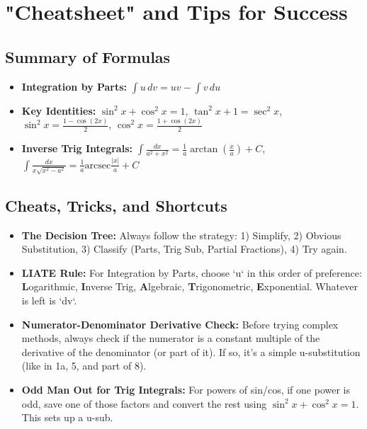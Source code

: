 \documentclass{article}
\begin{document}
\section{"Cheatsheet" and Tips for Success}
\subsection{Summary of Formulas}
\begin{itemize}
    \item \textbf{Integration by Parts:} $\int u \, dv = uv - \int v \, du$
    \item \textbf{Key Identities:} $\sin^2x+\cos^2x=1$, $\tan^2x+1=\sec^2x$, $\sin^2x = \frac{1-\cos(2x)}{2}$, $\cos^2x = \frac{1+\cos(2x)}{2}$
    \item \textbf{Inverse Trig Integrals:} $\int \frac{dx}{a^2+x^2} = \frac{1}{a}\arctan(\frac{x}{a})+C$, $\int \frac{dx}{x\sqrt{x^2-a^2}} = \frac{1}{a}\text{arcsec}\frac{|x|}{a}+C$
\end{itemize}

\subsection{Cheats, Tricks, and Shortcuts}
\begin{itemize}
    \item \textbf{The Decision Tree:} Always follow the strategy: 1) Simplify, 2) Obvious Substitution, 3) Classify (Parts, Trig Sub, Partial Fractions), 4) Try again.
    \item \textbf{LIATE Rule:} For Integration by Parts, choose `u` in this order of preference: \textbf{L}ogarithmic, \textbf{I}nverse Trig, \textbf{A}lgebraic, \textbf{T}rigonometric, \textbf{E}xponential. Whatever is left is `dv`.
    \item \textbf{Numerator-Denominator Derivative Check:} Before trying complex methods, always check if the numerator is a constant multiple of the derivative of the denominator (or part of it). If so, it's a simple u-substitution (like in 1a, 5, and part of 8).
    \item \textbf{Odd Man Out for Trig Integrals:} For powers of sin/cos, if one power is odd, save one of those factors and convert the rest using $\sin^2x+\cos^2x=1$. This sets up a u-sub.
\end{itemize}
\end{document}
